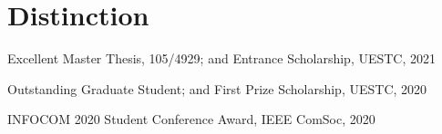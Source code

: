 \vspace{-8pt}
\section*{Distinction}
\vspace{-4pt}
\indent


Excellent Master Thesis, 105/4929; and Entrance Scholarship, UESTC, 2021

Outstanding Graduate Student; and First Prize Scholarship, UESTC, 2020

INFOCOM 2020 Student Conference Award, IEEE ComSoc, 2020
